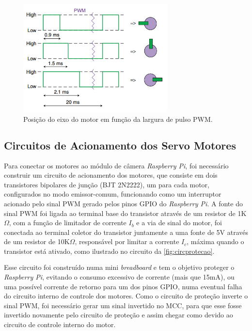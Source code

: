 \begin{figure}[H]
	\centering
	\includegraphics[width=0.7\textwidth]{figuras/pwm_servo.jpg}
	\caption{Posição do eixo do motor em função da largura de pulso PWM.}
	\label{fig:pwmservo}
\end{figure}

\subsection{Circuitos de Acionamento dos Servo Motores}
\label{subsec:servomotorcircacionamento}

Para conectar os motores ao módulo de câmera \textit{Raspberry Pi}, foi necessário construir um circuito de acionamento dos motores, que consiste em dois transistores bipolares de junção (BJT 2N2222), um para cada motor, configurados no modo emissor-comum, funcionando como um interruptor acionado pelo sinal PWM gerado pelos pinos GPIO do \textit{Raspberry Pi}. A fonte do sinal PWM foi ligada ao terminal base do transistor através de um resistor de 1K$\Omega$, com a função de limitador de corrente $I_b$ e a via de sinal do motor, foi conectada ao terminal coletor do transistor juntamente a uma fonte de 5V através de um resistor de 10K$\Omega$, responsável por limitar a corrente $I_c$, máxima quando o transistor está ativado, como ilustrado no circuito da \autoref{fig:circprotecao}.\par

Esse circuito foi construído numa mini \textit{breadboard} e tem o objetivo proteger o \textit{Raspberry Pi}, evitando o consumo excessivo de corrente (mais que 15mA), ou uma possível corrente de retorno para um dos pinos GPIO, numa eventual falha do circuito interno de controle dos motores. Como o circuito de proteção inverte o sinal PWM, foi necessário gerar um sinal invertido no MCC, para que esse fosse invertido novamente pelo circuito de proteção e assim chegar como devido ao circuito de controle interno do motor.\par

